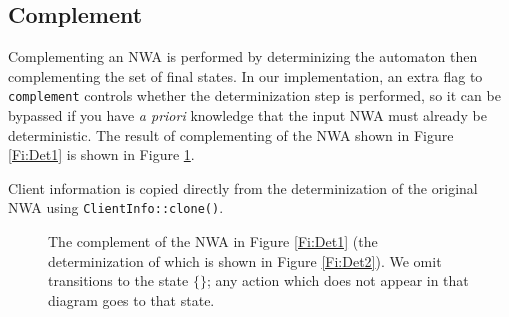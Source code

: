 


\subsection{Complement}
\label{Se:Complement}

Complementing an NWA is performed by determinizing the automaton then
complementing the set of final states. In our implementation, an extra flag
to \texttt{complement} controls whether the determinization step is
performed, so it can be bypassed if you have \textsl{a priori} knowledge that
the input NWA must already be deterministic. The result of
complementing of the NWA shown in Figure \ref{Fi:Det1} is
shown in Figure \ref{Fi:Comp1}.

Client information is copied directly
from the determinization of the original NWA using \texttt{ClientInfo::clone()}.

\begin{figure}[h]
  \centering
  \caption{The complement of the NWA in Figure \ref{Fi:Det1} (the
    determinization of which is shown in Figure \ref{Fi:Det2}).  We omit
    transitions to the state $\{\}$; any action which does not appear in that
    diagram goes to that state.
  }
  \label{Fi:Comp1}
\end{figure}



